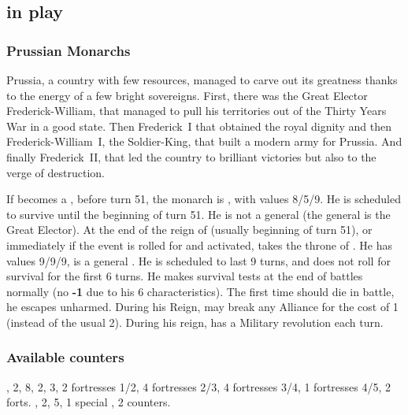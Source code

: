 \subsection{ in play}
\subsubsection{Prussian Monarchs}
\begin{histoire}
  Prussia, a country with few resources, managed to carve out its
  greatness thanks to the energy of a few bright sovereigns. First,
  there was the Great Elector Frederick-William, that managed to pull
  his territories out of the Thirty Years War in a good state. Then
  Frederick~I that obtained the royal dignity and then
  Frederick-William~I, the Soldier-King, that built a modern army for
  Prussia. And finally Frederick~II, that led the country to brilliant
  victories but also to the verge of destruction.
\end{histoire}
 If \PRU becomes a \MAJ,
before turn 51, the monarch is , with values
8/5/9. He is scheduled to survive until the beginning of turn 51. He is
not a general (the  general is the Great
Elector).
 At the end of the reign of
 (usually beginning of turn 51), or
immediately if the event  is rolled for
and activated,  takes the throne of
. He has values 9/9/9, is a general
. He is scheduled to last 9 turns, and does
not roll for survival for the first 6 turns.
\bparag He makes survival tests at the end of battles normally (no {\bf
  -1} due to his 6 characteristics).
 The first time 
should die in battle, he escapes unharmed.
\bparag During his Reign,  may break any Alliance for
the cost of 1 \STAB (instead of the usual 2).
\bparag During his reign, \PRU has a Military revolution each turn.

\subsubsection{Available counters}
\ARMY, 2\LDND, 8\LD, 2\NTD, 3\LDENDE, 2
fortresses 1/2, 4 fortresses 2/3, 4 fortresses 3/4, 1 fortresses 4/5, 2
forts.
\COL, 2\TP, 5\MNU, 1 special \MNU, 2\TradeFLEET
counters.

